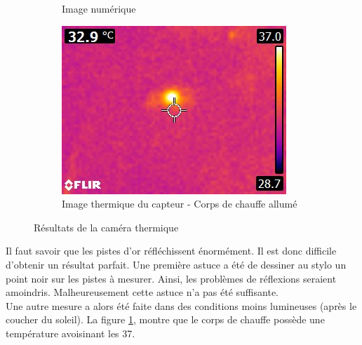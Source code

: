 \begin{figure}[H]
\begin{subfigure}[b]{0.3\textwidth}
        \caption{Image numérique}
    \end{subfigure}
    \begin{subfigure}[b]{0.4\textwidth}
        \includegraphics[scale = 0.5]{assets/figures/thermique_avec_chauffe.jpg}
        \caption{Image thermique du capteur - Corps de chauffe allumé}
    \end{subfigure}
    \caption{Résultats de la caméra thermique}
    \label{fig:cameraThermique}
\end{figure}

Il faut savoir que les pistes d'or réfléchissent énormément. Il est donc difficile d'obtenir un résultat parfait. Une première astuce a été de
dessiner au stylo un point noir sur les pistes à mesurer. Ainsi, les problèmes de réflexions seraient amoindris. Malheureusement cette astuce n'a
pas été suffisante. \\

Une autre mesure a alors été faite dans des conditions moins lumineuses (après le coucher du soleil). La figure \ref*{fig:cameraThermique},
montre que le corps de chauffe possède une température avoisinant les 37\textdegree. \\

